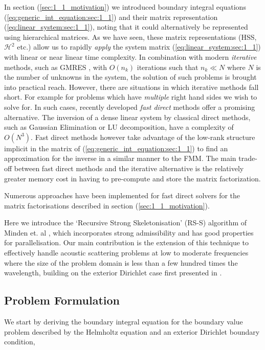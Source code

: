 In section (\ref{sec:1_1_motivation}) we introduced boundary integral equations (\ref{eq:generic_int_equation:sec:1_1}) and their matrix representation (\ref{eq:linear_system:sec:1_1}), noting that it could alternatively be represented using hierarchical matrices. As we have seen, these matrix representations (HSS, $\mathcal{H}^2$ etc.) allow us to rapidly \textit{apply} the system matrix (\ref{eq:linear_system:sec:1_1}) with linear or near linear time complexity. In combination with modern \textit{iterative} methods, such as GMRES \cite{saad1986gmres}, with $O(n_k)$ iterations such that $n_k \ll N$ where $N$ is the number of unknowns in the system, the solution of such problems is brought into practical reach. However, there are situations in which iterative methods fall short. For example for problems which have \textit{multiple} right hand sides we wish to solve for. In such cases, recently developed \textit{fast direct} methods offer a promising alternative. The inversion of a dense linear system by classical direct methods, such as Gaussian Elimination or LU decomposition, have a complexity of $O(N^3)$. Fast direct methods however take advantage of the low-rank structure implicit in the matrix of (\ref{eq:generic_int_equation:sec:1_1}) to find an approximation for the inverse in a similar manner to the FMM. The main trade-off between fast direct methods and the iterative alternative is the relatively greater memory cost in having to pre-compute and store the matrix factorization.

Numerous approaches have been implemented for fast direct solvers for the matrix factorisations described in section (\ref{sec:1_1_motivation}). 

Here we introduce the `Recursive Strong Skeletonisation' (RS-S) algorithm of Minden et. al \cite{minden2017recursive}, which incorporates strong admissibility and has good properties for parallelisation. Our main contribution is the extension of this technique to effectively handle acoustic scattering problems at low to moderate frequencies where the size of the problem domain is less than a few hundred times the wavelength, building on the exterior Dirichlet case first presented in \cite{sushnikova2022fmm}. 

\subsection*{Problem Formulation}

We start by deriving the boundary integral equation for the boundary value problem described by the Helmholtz equation and an exterior Dirichlet boundary condition,

